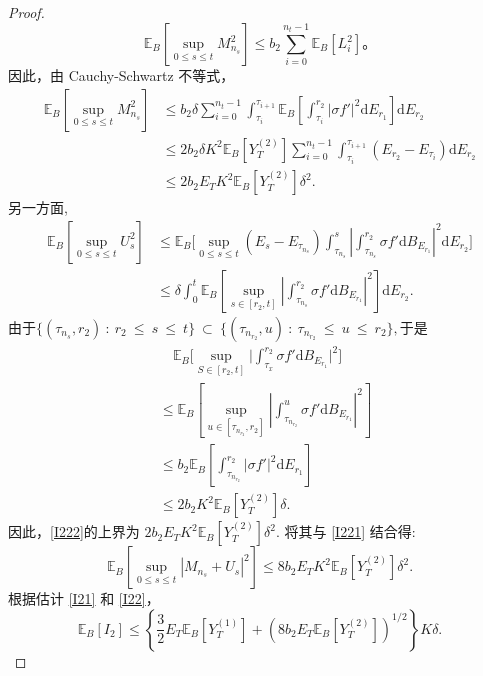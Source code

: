 \begin{proof}
	$$
	\mathbb{E}_B \left[\sup_{0 \leq s \leq t} M_{n_s}^2\right] \leq b_2 \sum_{i=0}^{n_t-1} \mathbb{E}_B [L_i^2]。
	$$
	因此，由 Cauchy-Schwartz 不等式，
	\begin{align}
		\mathbb{E}_B\left[\sup_{0\leq s\leq t}M_{n_s}^2\right] 
		&\leq b_2\delta\sum_{i=0}^{n_t-1}\int_{\tau_i}^{\tau_{i+1}}\mathbb{E}_B
		\left[\int_{\tau_i}^{r_2}\left|\sigma f'\right|^2\mathrm{d}E_{r_1}\right]
		\mathrm{d}E_{r_2} \nonumber \\
		&\leq2b_2\delta K^2\mathbb{E}_B[Y_T^{(2)}]\sum_{i=0}^{n_t-1}\int_{\tau_i}^
		{\tau_{i+1}}(E_{r_2}-E_{\tau_i})\mathrm{d}E_{r_2} \nonumber \\
		&\leq 2b_2E_TK^2\mathbb{E}_B[Y_T^{(2)}]\delta^2. \label{I221}
	\end{align}
	另一方面, 
	\begin{align}
	\mathbb{E}_B\left[\sup_{0\leq s\leq t}U_s^2\right]  
	&\leq\mathbb{E}_B\biggl[\sup_{0\leq s\leq t}(E_s-E_{\tau_{n_s}})\int_{\tau_{n_s}}^s\left|\int_{\tau_{n_s}}^{r_2}\sigma f'\mathrm{d}B_{E_{r_1}}\right|^2\mathrm{d}E_{r_2}\biggr] \nonumber \\ &\leq\delta\int_0^t\mathbb{E}_B\left[\sup_{s\in[r_2,t]}\left|\int_{\tau_{n_s}}^{r_2}\sigma f'\mathrm{d}B_{E_{r_1}}\right|^2\right]\mathrm{d}E_{r_2}.\label{I222}
	\end{align}
	由于$\{(\tau_{n_s},r_2)~:~r_2~\leq~s~\leq~t\}~\subset~\{(\tau_{n_{r_2}},u)~:~\tau_{n_{r_2}}~\leq~u~\leq~r_2\},$于是
	\begin{align*}
	&\quad\mathbb{E}_B\Big[\sup_{S\in[r_2,t]}\Big|\int_{\tau_x}^{r_2}\sigma f'\mathrm{d}B_{E_{r_1}}\Big|^2\Big]  \\
	&\le \mathbb{E}_B\left[\sup_{u\in[\tau_{n_{r_2}},r_2]}\left|\int_{\tau_{n_{r_2}}}^u\sigma f'\mathrm{d}B_{E_{r_1}}\right|^2\right] \\
	&\leq b_2\mathbb{E}_B\left[\int_{\tau_{n_{r_2}}}^{r_2}\left|\sigma f'\right|^2\mathrm{d}E_{r_1}\right]\\
	&\leq 2b_2K^2\mathbb{E}_B[Y_T^{(2)}]\delta.
	\end{align*}
	因此，\cref{I222}的上界为  $2b_2E_TK^2\mathbb{E}_B[Y_T^{(2)}]\delta^2.$ 将其与 \cref{I221} 结合得:
	\begin{equation}\label{I22}
					\mathbb{E}_B\left[\sup_{0\leq s\leq t}|M_{n_s}+U_s|^2\right] 
		\leq 8b_2E_TK^2\mathbb{E}_B[Y_T^{(2)}]\delta^2. 
	\end{equation}
	根据估计 \cref{I21} 和 \cref{I22}，
	\begin{equation}\label{I2}
		\mathbb{E}_B[I_2] 
		\leq \left\{\frac{3}{2}E_T\mathbb{E}_B[Y_T^{(1)}]+(8b_2E_T\mathbb{E}_B[Y_T^{(2)}])^{1/2}\right\}K\delta. 
	\end{equation}
	

\end{proof}
